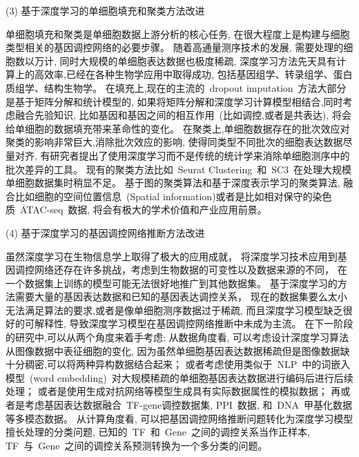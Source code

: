 (3) 基于深度学习的单细胞填充和聚类方法改进

单细胞填充和聚类是单细胞数据上游分析的核心任务, 
在很大程度上是构建与细胞类型相关的基因调控网络的必要步骤。
随着高通量测序技术的发展, 需要处理的细胞数以万计, 同时大规模的单细胞表达数据也极度稀疏,
深度学习方法先天具有计算上的高效率,已经在各种生物学应用中取得成功,
包括基因组学、转录组学、蛋白质组学、结构生物学。
在填充上,现在的主流的~dropout imputation~方法大部分是基于矩阵分解和统计模型的,
如果将矩阵分解和深度学习计算模型相结合,同时考虑融合先验知识,
比如基因和基因之间的相互作用~(比如调控,或者是共表达),
将会给单细胞的数据填充带来革命性的变化。
在聚类上,单细胞数据存在的批次效应对聚类的影响非常巨大,消除批次效应的影响,
使得同类型不同批次的细胞表达数据尽量对齐,
有研究者提出了使用深度学习而不是传统的统计学来消除单细胞测序中的批次差异的工具。
现有的聚类方法比如~Seurat Clustering~和~SC3~在处理大规模单细胞数据集时稍显不足。
基于图的聚类算法和基于深度表示学习的聚类算法,
融合比如细胞的空间位置信息~(Spatial information)或者是比如相对保守的染色质~ATAC-seq~数据, 
将会有极大的学术价值和产业应用前景。

(4) 基于深度学习的基因调控网络推断方法改进

虽然深度学习在生物信息学上取得了极大的应用成就，
将深度学习技术应用到基因调控网络还存在许多挑战，考虑到生物数据的可变性以及数据来源的不同，
在一个数据集上训练的模型可能无法很好地推广到其他数据集。
基于深度学习的方法需要大量的基因表达数据和已知的基因表达调控关系，
现在的数据集要么太小无法满足算法的要求,或者是像单细胞测序数据过于稀疏,
而且深度学习模型缺乏很好的可解释性,
导致深度学习模型在基因调控网络推断中未成为主流。
在下一阶段的研究中,可以从两个角度来着手考虑:
从数据角度看,
可以考虑设计深度学习算法从图像数据中表征细胞的变化,
因为虽然单细胞基因表达数据稀疏但是图像数据缺十分稠密,可以将两种异构数据结合起来；
或者考虑使用类似于~NLP~中的词嵌入模型~(word embedding)~对大规模稀疏的单细胞基因表达数据进行编码后进行后续处理；
或者是使用生成对抗网络等模型生成具有实际数据属性的模拟数据；
再或者是考虑基因表达数据融合~TF-gene调控数据集, PPI~数据, 和~DNA~甲基化数据等多模态数据。
从计算角度看, 
可以把基因调控网络推断问题转化为深度学习模型擅长处理的分类问题, 已知的~TF~和~Gene~之间的调控关系当作正样本,
TF~与~Gene~之间的调控关系预测转换为一个多分类的问题。